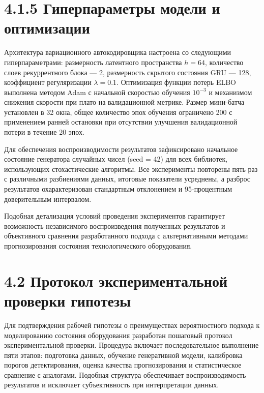 \documentclass[14pt, a4paper, oneside]{extreport}
\begin{document}
\vspace{1em}
\section{4.1.5 Гиперпараметры модели и оптимизации}
\vspace{1em}

Архитектура вариационного автокодировщика настроена со следующими гиперпараметрами: размерность латентного пространства $h = 64$, количество слоев рекуррентного блока — 2, размерность скрытого состояния GRU — 128, коэффициент регуляризации $\lambda = 0.1$. Оптимизация функции потерь ELBO выполнена методом Adam с начальной скоростью обучения $10^{-3}$ и механизмом снижения скорости при плато на валидационной метрике. Размер мини-батча установлен в 32 окна, общее количество эпох обучения ограничено 200 с применением ранней остановки при отсутствии улучшения валидационной потери в течение 20 эпох.

Для обеспечения воспроизводимости результатов зафиксировано начальное состояние генератора случайных чисел (seed = 42) для всех библиотек, использующих стохастические алгоритмы. Все эксперименты повторены пять раз с различными разбиениями данных, итоговые показатели усреднены, а разброс результатов охарактеризован стандартным отклонением и 95-процентным доверительным интервалом.

Подобная детализация условий проведения экспериментов гарантирует возможность независимого воспроизведения полученных результатов и объективного сравнения разработанного подхода с альтернативными методами прогнозирования состояния технологического оборудования.


\vspace{1em}
\section{4.2 Протокол экспериментальной проверки гипотезы}
\vspace{1em}

Для подтверждения рабочей гипотезы о преимуществах вероятностного подхода к моделированию состояния оборудования разработан пошаговый протокол экспериментальной проверки. Процедура включает последовательное выполнение пяти этапов: подготовка данных, обучение генеративной модели, калибровка порогов детектирования, оценка качества прогнозирования и статистическое сравнение с аналогами. Подобная структура обеспечивает воспроизводимость результатов и исключает субъективность при интерпретации данных.
\end{document}
